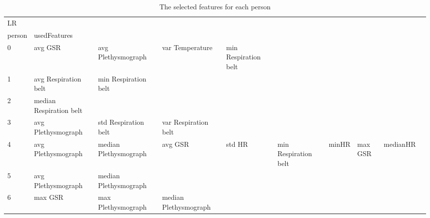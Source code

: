 \begin{landscape}
\begin{table}[]
\centering
\caption{The selected features for each person}
\begin{tabular}{l|llllllll}
LR       &                         &                       &                         &                         &                         &                       &                      &          &                      &        \\
person   & usedFeatures            &                       &                         &                         &                         &                       &                      &          &                      &        \\
0        & avg GSR                 & avg Plethysmograph    & var Temperature         & min Respiration belt    &                         &                       &                      &          &                      &        \\
1        & avg Respiration belt    & min Respiration belt  &                         &                         &                         &                       &                      &          &                      &        \\
2        & median Respiration belt &                       &                         &                         &                         &                       &                      &          &                      &        \\
3        & avg Plethysmograph      & std Respiration belt  & var Respiration belt    &                         &                         &                       &                      &          &                      &        \\
4        & avg Plethysmograph      & median Plethysmograph & avg GSR                 & std HR                  & min Respiration belt    & minHR                 & max GSR              & medianHR &                      &        \\
5        & avg Plethysmograph      & median Plethysmograph &                         &                         &                         &                       &                      &          &                      &        \\
6        & max GSR                 & max Plethysmograph    & median Plethysmograph   &                         &                         &                       &                      &          &                      &        \\

\end{tabular}
\end{table}
\end{landscape}
